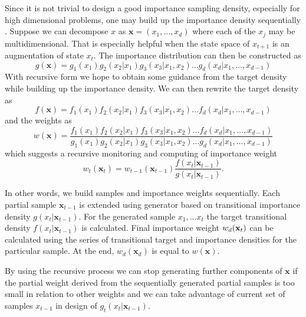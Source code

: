 \documentclass[times, utf8, diplomski]{fer}
\begin{document}
Since it is not trivial to design a good importance sampling density, especially for high dimensional problems, one may build up the importance density sequentially \cite{Liu}. Suppose we can decompose $x$ as $\mathbf{x} = (x_1, \ldots, x_d)$ where each of the $x_j$ may be multidimensional. That is especially helpful when the state space of $x_{t+1}$ is an augmentation of state $x_{t}$. The importance distribution can then be constructed as 
\begin{equation*}
g(\mathbf{x}) = g_1(x_1) g_2(x_2 | x_1) g_3(x_3 | x_1, x_2) \ldots g_d(x_d | x_1, \ldots, x_{d - 1})
\end{equation*}
With recursive form we hope to obtain some guidance from the target density while building up the  importance density. We can then rewrite the target density as 
\begin{equation*}
f(\mathbf{x}) = f_1(x_1) f_2(x_2 | x_1) f_3(x_3 | x_1, x_2) \ldots f_d(x_d | x_1, \ldots, x_{d - 1})
\end{equation*}
and the weights as 
\begin{equation}
w(\mathbf{x}) = \frac{f_1(x_1) f_2(x_2 | x_1) f_3(x_3 | x_1, x_2) \ldots f_d(x_d | x_1, \ldots, x_{d - 1})}{g_1(x_1) g_2(x_2 | x_1) g_3(x_3 | x_1, x_2) \ldots g_d(x_d | x_1, \ldots, x_{d - 1})}
\end{equation}
which suggests a recursive monitoring and computing of importance weight
\begin{equation}
w_t(\mathbf{x}_t) = w_{t - 1}(\mathbf{x}_{t - 1})\frac{f(x_t | \mathbf{x}_{t - 1})}{g(x_t | \mathbf{x}_{t - 1})}. 
\label{wei_rec}   
\end{equation}

In other words, we build samples and importance weights sequentially. Each partial sample $\mathbf{x}_{t - 1}$ is extended using generator based on transitional importance density $g(x_t | \mathbf{x}_{t - 1})$. For the generated sample $x_1, \ldots x_t$ the target transitional density $f(x_t | \mathbf{x}_{t - 1})$ is calculated. Final importance weight $w_d(\textbf x_t)$ can be calculated using the series of transitional target and importance densities for the particular sample.  
At the end, $w_d(\mathbf x_d)$ is equal to $w(\mathbf{x})$. 

By using the recursive process we can stop generating further components of $\mathbf{x}$ if the partial weight derived from the sequentially generated partial samples is too small in relation to other weights and we can take advantage of current set of samples $x_{t - 1}$ in design of  $g_t(x_t | \mathbf{x}_{t - 1})$.
\end{document}

